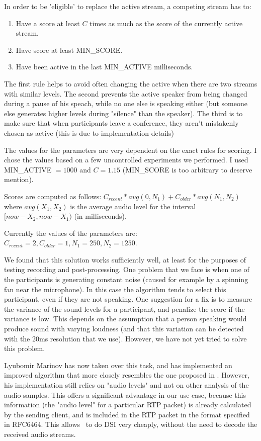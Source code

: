 \documentclass[twoside,openright,a4paper,12pt,english]{article}
\begin{document}
In order to be 'eligible' to replace the active stream, a competing stream has to:
\begin{enumerate}
    \item Have a score at least $C$ times as much as the score of the currently active stream.
    \item Have score at least MIN\_SCORE.
    \item Have been active in the last MIN\_ACTIVE milliseconds.
\end{enumerate}

The first rule helps to avoid often changing the active when there are two
streams with similar levels. The second prevents the active speaker from being
changed during a pause of his speach, while no one else is speaking either (but
someone else generates higher levels during "silence" than the speaker). The
third is to make sure that when participants leave a conference, they aren't
mistakenly chosen as active (this is due to implementation details)

The values for the parameters are very dependent on the exact rules for scoring.
I chose the values based on a few uncontrolled experiments we performed. I used
MIN\_ACTIVE $= 1000$ and $C = 1.15$ (MIN\_SCORE is too arbitrary to deserve mention).

Scores are computed as follows: $C_{recent} * avg(0, N_1) + C_{older} * avg(N_1, N_2)$
where $avg(X_1, X_2)$ is the average audio level for the interval $[now-X_2,
now-X_1)$ (in milliseconds). 

Currently the values of the parameters are: $C_{recent} = 2, C_{older} = 1, N_1 = 250, N_2 = 1250$.


\bigskip
We found that this solution works sufficiently well, at least for the purposes
of testing recording and post-processing. One problem that we face is when
one of the participants is generating constant noise (caused for example by a
spinning fan near the microphone). In this case the algorithm tends to select this participant,
even if they are not speaking. One suggestion for a fix is to measure the
variance of the sound levels for a participant, and penalize the score if the
variance is low. This depends on the assumption that a person speaking would
produce sound with varying loudness (and that this variation can be detected
with the 20ms resolution that we use). However, we have not yet tried to solve
this problem.

Lyubomir Marinov has now taken over this task, and has implemented an improved algorithm that more closely resembles the
one proposed in \cite{volfin2012}. However, his implementation still relies on
"audio levels" and not on other analysis of the audio samples. This offers a significant advantage
in our use case, because this information (the "audio level" for a particular RTP packet) is already
calculated by the sending client, and is included in the RTP packet in the format specified in RFC6464\cite{rfc6464}.
This allows \jvb\ to do DSI very cheaply, without the need to decode the received audio streams.
\end{document}
